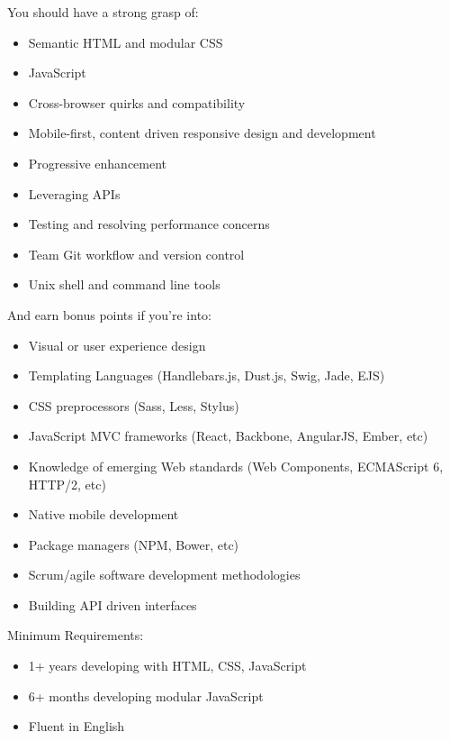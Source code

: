 You should have a strong grasp of:
\begin{itemize}
\item Semantic HTML and modular CSS
\item JavaScript
\item Cross-browser quirks and compatibility
\item Mobile-first, content driven responsive design and development
\item Progressive enhancement
\item Leveraging APIs
\item Testing and resolving performance concerns
\item Team Git workflow and version control
\item Unix shell and command line tools
\end{itemize}

And earn bonus points if you're into:
\begin{itemize}
\item Visual or user experience design
\item Templating Languages (Handlebars.js, Dust.js, Swig, Jade, EJS)
\item CSS preprocessors (Sass, Less, Stylus)
\item JavaScript MVC frameworks (React, Backbone, AngularJS, Ember, etc)
\item Knowledge of emerging Web standards (Web Components, ECMAScript 6, HTTP/2, etc)
\item Native mobile development
\item Package managers (NPM, Bower, etc)
\item Scrum/agile software development methodologies
\item Building API driven interfaces
\end{itemize}

Minimum Requirements:
\begin{itemize}
\item 1+ years developing with HTML, CSS, JavaScript
\item 6+ months developing modular JavaScript
\item Fluent in English
\end{itemize}